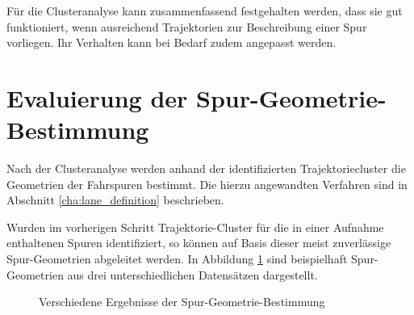 Für die Clusteranalyse kann zusammenfassend festgehalten werden, dass sie gut funktioniert, wenn ausreichend Trajektorien
zur Beschreibung einer Spur vorliegen. Ihr Verhalten kann bei Bedarf zudem angepasst werden.

\section{Evaluierung der Spur-Geometrie-Bestimmung}

Nach der Clusteranalyse werden anhand der identifizierten Trajektoriecluster die Geometrien der Fahrspuren
bestimmt. Die hierzu angewandten Verfahren sind in Abschnitt \ref{cha:lane_definition} beschrieben.

Wurden im vorherigen Schritt Trajektorie-Cluster für die in einer Aufnahme enthaltenen Spuren identifiziert,
so können auf Basis dieser meist zuverlässige Spur-Geometrien abgeleitet werden.
In Abbildung \ref{fig:results_laneGeometries} sind beispielhaft Spur-Geometrien aus drei unterschiedlichen Datensätzen dargestellt.

\begin{figure}[H]
    \centering
    \qquad \qquad
    \hfill
    \caption[Ergebnisse Spur-Geometrie-Bestimmung]{Verschiedene Ergebnisse der Spur-Geometrie-Bestimmung}
    \label{fig:results_laneGeometries}
\end{figure}

